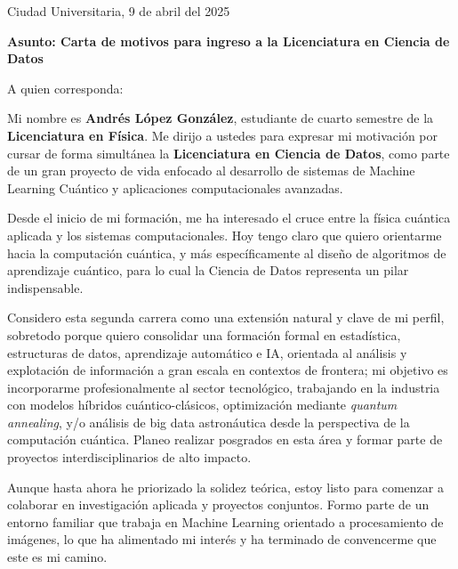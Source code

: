 \documentclass[article,12pt]{elsarticle}
\begin{document}

\vspace*{1cm}

\begin{flushright}
Ciudad Universitaria, 9 de abril del 2025
\end{flushright}

\vspace{0.5cm}

\textbf{Asunto: Carta de motivos para ingreso a la Licenciatura en Ciencia de Datos}

\vspace{0.5cm}

A quien corresponda:

\vspace{0.5cm}

Mi nombre es \textbf{Andrés López González}, estudiante de cuarto semestre de la \textbf{Licenciatura en Física}. Me dirijo a ustedes para expresar mi motivación por cursar de forma simultánea la \textbf{Licenciatura en Ciencia de Datos}, como parte de un gran proyecto de vida enfocado al desarrollo de sistemas de Machine Learning Cuántico y aplicaciones computacionales avanzadas.

Desde el inicio de mi formación, me ha interesado el cruce entre la física cuántica aplicada y los sistemas computacionales. Hoy tengo claro que quiero orientarme hacia la computación cuántica, y más específicamente al diseño de algoritmos de aprendizaje cuántico, para lo cual la Ciencia de Datos representa un pilar indispensable.

Considero esta segunda carrera como una extensión natural y clave de mi perfil, sobretodo porque quiero consolidar una formación formal en estadística, estructuras de datos, aprendizaje automático e IA, orientada al análisis y explotación de información a gran escala en contextos de frontera; mi objetivo es incorporarme profesionalmente al sector tecnológico, trabajando en la industria con modelos híbridos cuántico-clásicos, optimización mediante \textit{quantum annealing}, y/o análisis de big data astronáutica desde la perspectiva de la computación cuántica. Planeo realizar posgrados en esta área y formar parte de proyectos interdisciplinarios de alto impacto.

Aunque hasta ahora he priorizado la solidez teórica, estoy listo para comenzar a colaborar en investigación aplicada y proyectos conjuntos. Formo parte de un entorno familiar que trabaja en Machine Learning orientado a procesamiento de imágenes, lo que ha alimentado mi interés y ha terminado de convencerme que este es mi camino.
\end{document}
